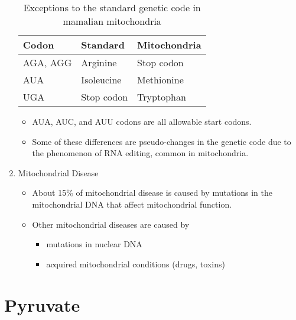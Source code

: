 \documentclass{scrartcl}
\begin{document}
\begin{enumerate}
\begin{table}[htbp]
\caption[mito code]{\label{tab:orgc60b901}
Exceptions to the standard genetic code in mamalian mitochondria}
\centering
\begin{tabular}{lll}
Codon & Standard & Mitochondria\\
\hline
AGA, AGG & Arginine & Stop codon\\
AUA & Isoleucine & Methionine\\
UGA & Stop codon & Tryptophan\\
\end{tabular}
\end{table}

\begin{itemize}
\item AUA, AUC, and AUU codons are all allowable start codons.
\item Some of these differences are pseudo-changes in the genetic code due
to the phenomenon of RNA editing, common in mitochondria.
\end{itemize}

\item Mitochondrial Disease
\label{sec:orgde19571}
\begin{itemize}
\item About 15\% of mitochondrial disease is caused by mutations in the
mitochondrial DNA that affect mitochondrial function.
\item Other mitochondrial diseases are caused by
\begin{itemize}
\item mutations in nuclear DNA
\item acquired mitochondrial conditions (drugs, toxins)
\end{itemize}
\end{itemize}
\end{enumerate}
\section{Pyruvate}
\label{sec:orgcf02974}
\end{document}
